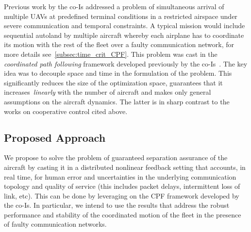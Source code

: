 \documentclass[letter,onecolumn,12pt]{aiaa-tc}
\newcommand{\1}{1_n}
\begin{document}
Previous work by the co-Is addressed a problem of simultaneous arrival of multiple UAVs at predefined terminal conditions in a restricted airspace under severe communication and temporal constraints. A typical mission would include sequential autoland by multiple aircraft whereby each airplane has to coordinate its motion with the rest of the fleet over a faulty communication network, for more details see~\ref{subsec:time_crit_CPF}. This problem was cast in the {\it coordinated path following} framework developed previously by the co-Is~\cite{CSM12_CPF}. The key idea was to decouple space and time in the formulation of the problem. This significantly reduces the size of the optimization space, guarantees that it increases~\emph{linearly} with the number of aircraft and makes only general assumptions on
the aircraft dynamics. The latter is in sharp contrast to the works on cooperative control cited above.

\subsection{Proposed Approach}
We propose to solve the problem of guaranteed separation assurance of the aircraft by casting it in a distributed nonlinear feedback setting that accounts, in real time, for human error and uncertainties in the underlying communication topology and quality of service (this includes packet delays, intermittent loss of link, etc).  This can be done by leveraging on the CPF framework developed by the co-Is.  In particular, we intend to use the results that address the robust performance and stability of the coordinated motion of the fleet in the presence of faulty communication networks.
\end{document}
